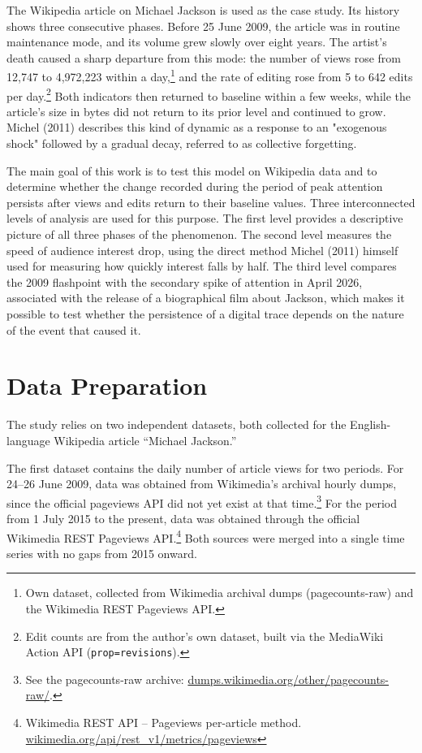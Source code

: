 \documentclass[11pt]{article}
\begin{document}
The Wikipedia article on Michael Jackson is used as the case study. Its history shows three consecutive phases. Before 25 June 2009, the article was in routine maintenance mode, and its volume grew slowly over eight years. The artist's death caused a sharp departure from this mode: the number of views rose from 12{,}747 to 4{,}972{,}223 within a day,\footnote{Own dataset, collected from Wikimedia archival dumps (pagecounts-raw) and the Wikimedia REST Pageviews API.} and the rate of editing rose from 5 to 642 edits per day.\footnote{Edit counts are from the author's own dataset, built via the MediaWiki Action API (\texttt{prop=revisions}).} Both indicators then returned to baseline within a few weeks, while the article's size in bytes did not return to its prior level and continued to grow. Michel (2011) describes this kind of dynamic as a response to an "exogenous shock" followed by a gradual decay, referred to as collective forgetting.

The main goal of this work is to test this model on Wikipedia data and to determine whether the change recorded during the period of peak attention persists after views and edits return to their baseline values. Three interconnected levels of analysis are used for this purpose. The first level provides a descriptive picture of all three phases of the phenomenon. The second level measures the speed of audience interest drop, using the direct method Michel (2011) himself used for measuring how quickly interest falls by half. The third level compares the 2009 flashpoint with the secondary spike of attention in April 2026, associated with the release of a biographical film about Jackson, which makes it possible to test whether the persistence of a digital trace depends on the nature of the event that caused it.


\section*{Data Preparation}

The study relies on two independent datasets, both collected for the English-language Wikipedia article ``Michael Jackson.''

The first dataset contains the daily number of article views for two periods. For 24--26 June 2009, data was obtained from Wikimedia's archival hourly dumps, since the official pageviews API did not yet exist at that time.\footnote{See the pagecounts-raw archive: \url{dumps.wikimedia.org/other/pagecounts-raw/}.} For the period from 1 July 2015 to the present, data was obtained through the official Wikimedia REST Pageviews API.\footnote{Wikimedia REST API -- Pageviews per-article method. \url{wikimedia.org/api/rest_v1/metrics/pageviews}} Both sources were merged into a single time series with no gaps from 2015 onward.
\end{document}
